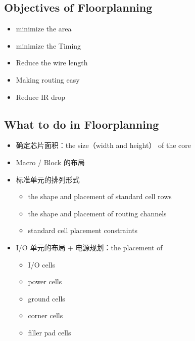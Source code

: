 \documentclass[letterpaper,10pt,english]{sphinxmanual}
\begin{document}
\subsection{Objectives of Floorplanning}
\label{\detokenize{chapter5/_u6982_u8ff0:objectives-of-floorplanning}}\begin{itemize}
\item {} 
\sphinxAtStartPar
minimize the area

\item {} 
\sphinxAtStartPar
minimize the Timing

\item {} 
\sphinxAtStartPar
Reduce the wire length

\item {} 
\sphinxAtStartPar
Making routing easy

\item {} 
\sphinxAtStartPar
Reduce IR drop

\end{itemize}


\subsection{What to do in Floorplanning}
\label{\detokenize{chapter5/_u6982_u8ff0:what-to-do-in-floorplanning}}\begin{itemize}
\item {} 
\sphinxAtStartPar
确定芯片面积：the size（width and height） of the core

\item {} 
\sphinxAtStartPar
Macro / Block 的布局

\item {} 
\sphinxAtStartPar
标准单元的排列形式
\begin{itemize}
\item {} 
\sphinxAtStartPar
the shape and placement of standard cell rows

\item {} 
\sphinxAtStartPar
the shape and placement of routing channels

\item {} 
\sphinxAtStartPar
standard cell placement constraints

\end{itemize}

\item {} 
\sphinxAtStartPar
I/O 单元的布局 + 电源规划：the placement of
\begin{itemize}
\item {} 
\sphinxAtStartPar
I/O cells

\item {} 
\sphinxAtStartPar
power cells

\item {} 
\sphinxAtStartPar
ground cells

\item {} 
\sphinxAtStartPar
corner cells

\item {} 
\sphinxAtStartPar
filler pad cells

\end{itemize}

\end{itemize}
\end{document}
